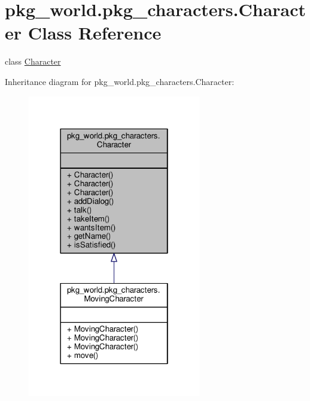 \hypertarget{classpkg__world_1_1pkg__characters_1_1Character}{\section{pkg\-\_\-world.\-pkg\-\_\-characters.\-Character Class Reference}
\label{classpkg__world_1_1pkg__characters_1_1Character}
}


class \hyperlink{classpkg__world_1_1pkg__characters_1_1Character}{Character}  




Inheritance diagram for pkg\-\_\-world.\-pkg\-\_\-characters.\-Character\-:\nopagebreak
\begin{figure}[H]
\begin{center}
\leavevmode
\includegraphics[width=214pt]{classpkg__world_1_1pkg__characters_1_1Character__inherit__graph}
\end{center}
\end{figure}


